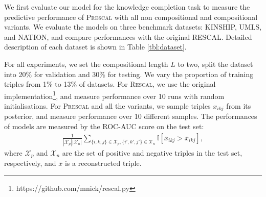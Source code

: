 

We first evaluate our model for the knowledge completion task
to measure the predictive performance of \textsc{Prescal} with all non compositional and compositional variants.
We evaluate the models on three benchmark datasets: KINSHIP, UMLS, and NATION, and compare  performances with the original \textsc{RESCAL}. 
Detailed description of each
dataset is shown in Table \ref{tbl:dataset}.

For all experiments, we set the compositional length $L$ to two, split the dataset into 20\% for validation and 30\% for testing. We vary the proportion of training triples
from 1\% to 13\% of datasets. For \textsc{Rescal}, we use the original implementation\footnote{https://github.com/mnick/rescal.py}, and measure performance over 10 runs with random initialisations. For \textsc{Prescal} and all the variants, we sample triples $x_{ikj}$ from its posterior, and measure performance over 10 different samples.
The performances of models are measured by the ROC-AUC score on the test set:
\begin{align}
\frac{1}{|\mathcal{X}_p|  |\mathcal{X}_n|} \sum_{\{i,k,j\} \in \mathcal{X}_p, \{i',k',j'\} \in \mathcal{X}_n} \mathbb{I}[\bar{x}_{ikj} > \bar{x}_{ikj}],
\end{align}
where $\mathcal{X}_p$ and $\mathcal{X}_n$ are the set of positive and negative triples in the test set, respectively, and $\bar{x}$ is a reconstructed triple.

